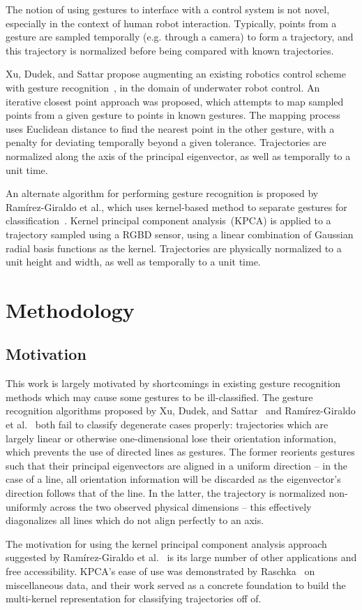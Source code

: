 \documentclass[12pt,journal,compsoc]{IEEEtran}
\begin{document}
The notion of using gestures to interface with a control system is not
novel, especially in the context of human robot interaction. Typically,
points from a gesture are sampled temporally (e.g. through a camera) to
form a trajectory, and this trajectory is normalized before being compared
with known trajectories.
\par
Xu, Dudek, and Sattar propose augmenting an existing robotics control scheme
with gesture recognition~\cite{xu08}, in the domain of underwater robot control.
An iterative closest point approach was proposed, which attempts to
map sampled points from a given gesture to points in known gestures.
The mapping process uses Euclidean distance to find the nearest point
in the other gesture, with a penalty for deviating temporally beyond a given tolerance.
Trajectories are normalized along the axis of the principal eigenvector,
as well as temporally to a unit time.
\par
An alternate algorithm for performing gesture recognition is proposed by
Ramírez-Giraldo et al., which uses kernel-based method to separate
gestures for classification~\cite{giraldo12}. Kernel principal component analysis~(KPCA)
is applied to a trajectory sampled using a RGBD sensor, using a linear
combination of Gaussian radial basis functions as the kernel.
Trajectories are physically normalized to a unit height and width, as well
as temporally to a unit time.


\section{Methodology}

\subsection{Motivation}

This work is largely motivated by shortcomings in existing gesture recognition methods
which may cause some gestures to be ill-classified. The gesture recognition algorithms
proposed by Xu, Dudek, and Sattar~\cite{xu08} and Ramírez-Giraldo et al.~\cite{giraldo12}
both fail to classify degenerate cases properly: trajectories which are largely linear
or otherwise one-dimensional lose their orientation information, which prevents the use
of directed lines as gestures. The former reorients gestures such that their principal
eigenvectors are aligned in a uniform direction -- in the case of a line, all orientation
information will be discarded as the eigenvector's direction follows that of the line.
In the latter, the trajectory is normalized non-uniformly across the two observed physical
dimensions -- this effectively diagonalizes all lines which do not align perfectly to an axis.
\par
The motivation for using the kernel principal component analysis approach suggested by
Ramírez-Giraldo et al.~\cite{giraldo12} is its large number of other applications and
free accessibility. KPCA's ease of use was demonstrated by Raschka~\cite{raschka14} on
miscellaneous data, and their work served as a concrete foundation to build the multi-kernel
representation for classifying trajectories off of.
\end{document}
